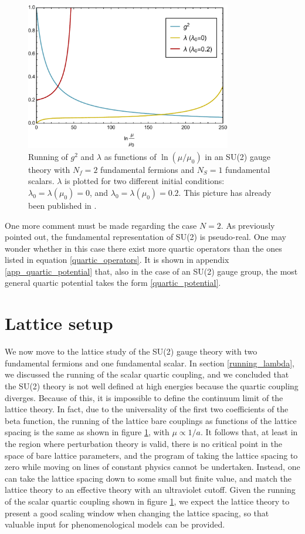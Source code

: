 \begin{figure}[thb] 
  \centering
  \includegraphics[width=9cm,clip]{pics/flow_N2}
  \caption{ Running of $g^2$ and $\lambda$ as functions of $\ln (\mu/\mu_0)$ in an SU(2) gauge theory with $N_f=2$ fundamental fermions and $N_S=1$ fundamental scalars. $\lambda$ is plotted for two different initial conditions: $\lambda_0 = \lambda(\mu_0) = 0$, and $\lambda_0=\lambda(\mu_0)=0.2$. This picture has already been published in \cite{Hansen:2017mrt}.}
  \label{flow_SU2}
\end{figure}

One more comment must be made regarding the case $N=2$. As previously pointed out, the fundamental representation of SU(2) is pseudo-real. One may wonder whether in this case there exist more quartic operators than the ones listed in equation \ref{quartic_operators}. It is shown in appendix \ref{app_quartic_potential} that, also in the case of an SU(2) gauge group, the most general quartic potential takes the form \ref{quartic_potential}.


\section{Lattice setup}


We now move to the lattice study of the SU(2) gauge theory with two fundamental fermions and one fundamental scalar. In section \ref{running_lambda}, we discussed the running of the scalar quartic coupling, and we concluded that the SU(2) theory is not well defined at high energies because the quartic coupling diverges. Because of this, it is impossible to define the continuum limit of the lattice theory. In fact, due to the universality of the first two coefficients of the beta function, the running of the lattice bare couplings as functions of the lattice spacing is the same as shown in figure \ref{flow_SU2}, with $\mu \propto 1/a$. It follows that, at least in the region where perturbation theory is valid, there is no critical point in the space of bare lattice parameters, and the program of taking the lattice spacing to zero while moving on lines of constant physics cannot be undertaken. Instead, one can take the lattice spacing down to some small but finite value, and match the lattice theory to an effective theory with an ultraviolet cutoff. Given the running of the scalar quartic coupling shown in figure \ref{flow_SU2}, we expect the lattice theory to present a good scaling window when changing the lattice spacing, so that valuable input for phenomenological models can be provided.

